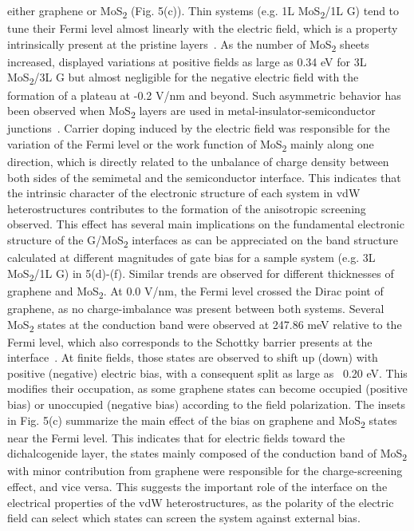 either graphene or MoS\textsubscript{2} (Fig. 5(c)). Thin systems (e.g. 1L MoS\textsubscript{2}/1L G)
tend to tune their Fermi level almost linearly with the electric
field, which is a property intrinsically present at the pristine
layers~\cite{Yu_2009_Tuning,Wang_2010_carrier_gr,Li_2013_WF_mos2}.  As
the number of MoS\textsubscript{2} sheets increased, displayed variations at positive
fields as large as 0.34 eV for 3L MoS\textsubscript{2}/3L G but almost negligible for
the negative electric field with the formation of a plateau at -0.2
V/nm and beyond. Such asymmetric behavior has been observed when MoS\textsubscript{2}
layers are used in metal-insulator-semiconductor
junctions~\cite{Chu_2017_eh_tunneling}. Carrier doping induced by the
electric field was responsible for the variation of the Fermi level or
the work function of MoS\textsubscript{2} mainly along one direction, which is
directly related to the unbalance of charge density between both sides
of the semimetal and the semiconductor interface. This indicates that
the intrinsic character of the electronic structure of each system in
vdW heterostructures contributes to the formation of the anisotropic
screening observed. This effect has several main implications on the
fundamental electronic structure of the G/MoS\textsubscript{2} interfaces as can be
appreciated on the band structure calculated at different magnitudes
of gate bias for a sample system (e.g. 3L MoS\textsubscript{2}/1L G) in 
5(d)-(f). Similar trends are observed for different thicknesses of
graphene and MoS\textsubscript{2}. At 0.0 V/nm, the Fermi level crossed the Dirac
point of graphene, as no charge-imbalance was present between both
systems. Several MoS\textsubscript{2} states at the conduction band were observed at
247.86 meV relative to the Fermi level, which also corresponds to the
Schottky barrier presents at the interface~\cite{Yu_2014_gr_mos2}.
%
At
finite fields, those states are observed to shift up (down) with
positive (negative) electric bias, with a consequent split as large as
~0.20 eV. This modifies their occupation, as some graphene states can
become occupied (positive bias) or unoccupied (negative bias)
according to the field polarization. The insets in Fig. 5(c) summarize
the main effect of the bias on graphene and MoS\textsubscript{2} states near the Fermi
level.  This indicates that for electric fields toward the
dichalcogenide layer, the states mainly composed of the conduction
band of MoS\textsubscript{2} with minor contribution from graphene were responsible
for the charge-screening effect, and vice versa. This suggests the
important role of the interface on the electrical properties of the
vdW heterostructures, as the polarity of the electric field can select
which states can screen the system against external bias.

